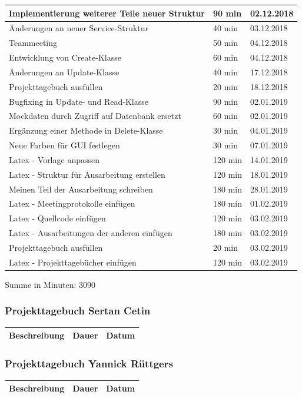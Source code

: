 \begin{longtable}{|p{10cm}|p{2cm}|p{2cm}|}
Implementierung weiterer Teile neuer Struktur & 90 min & 02.12.2018 \\ \hline
Änderungen an neuer Service-Struktur & 40 min & 03.12.2018 \\ \hline
Teammeeting & 50 min & 04.12.2018 \\ \hline
Entwicklung von Create-Klasse & 60 min & 04.12.2018 \\ \hline
Änderungen an Update-Klasse & 40 min & 17.12.2018 \\ \hline
Projekttagebuch ausfüllen & 20 min & 18.12.2018 \\ \hline
Bugfixing in Update- und Read-Klasse & 90 min & 02.01.2019 \\ \hline
Mockdaten durch Zugriff auf Datenbank ersetzt & 60 min & 02.01.2019 \\ \hline
Ergänzung einer Methode in Delete-Klasse & 30 min & 04.01.2019 \\ \hline
Neue Farben für GUI festlegen & 30 min & 07.01.2019 \\ \hline
Latex - Vorlage anpassen & 120 min & 14.01.2019 \\ \hline
Latex - Struktur für Ausarbeitung erstellen & 120 min & 18.01.2019 \\ \hline
Meinen Teil der Ausarbeitung schreiben & 180 min & 28.01.2019 \\ \hline
Latex - Meetingprotokolle einfügen & 180 min & 01.02.2019 \\ \hline
Latex - Quellcode einfügen & 120 min & 03.02.2019 \\ \hline
Latex - Ausarbeitungen der anderen einfügen & 180 min & 03.02.2019 \\ \hline
Projekttagebuch ausfüllen & 20 min & 03.02.2019 \\ \hline
Latex - Projekttagebücher einfügen & 120 min & 03.02.2019 \\ \hline
\end{longtable}
Summe in Minuten: 3090

\newpage
\subsubsection{Projekttagebuch Sertan Cetin}
\begin{longtable}{|p{10cm}|p{2cm}|p{2cm}|}
\hline
{\textbf{Beschreibung}} & {\textbf{Dauer}} & {\textbf{Datum}} \\ \hline

\end{longtable}

\newpage
\subsubsection{Projekttagebuch Yannick Rüttgers}
\begin{longtable}{|p{10cm}|p{2cm}|p{2cm}|}
\hline
{\textbf{Beschreibung}} & {\textbf{Dauer}} & {\textbf{Datum}} \\ \hline

\end{longtable}

